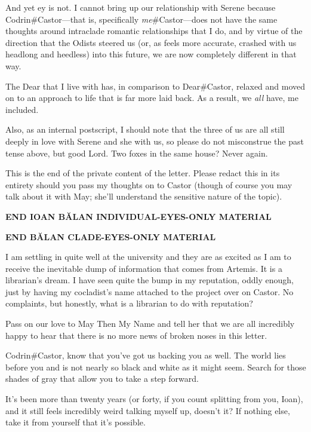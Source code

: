 And yet ey is not. I cannot bring up our relationship with Serene because Codrin\#Castor—that is, specifically \emph{me}\#Castor—does not have the same thoughts around intraclade romantic relationships that I do, and by virtue of the direction that the Odists steered us (or, as feels more accurate, crashed with us headlong and heedless) into this future, we are now completely different in that way.

The Dear that I live with has, in comparison to Dear\#Castor, relaxed and moved on to an approach to life that is far more laid back. As a result, we \emph{all} have, me included.

Also, as an internal postscript, I should note that the three of us are all still deeply in love with Serene and she with us, so please do not misconstrue the past tense above, but good Lord. Two foxes in the same house? Never again.

This is the end of the private content of the letter. Please redact this in its entirety should you pass my thoughts on to Castor (though of course you may talk about it with May; she'll understand the sensitive nature of the topic).

\begin{center}
\textbf{END IOAN BĂLAN INDIVIDUAL-EYES-ONLY MATERIAL}
\end{center}

\begin{center}
\textbf{END BĂLAN CLADE-EYES-ONLY MATERIAL}
\end{center}

\noindent I am settling in quite well at the university and they are as excited as I am to receive the inevitable dump of information that comes from Artemis. It is a librarian's dream. I have seen quite the bump in my reputation, oddly enough, just by having my cocladist's name attached to the project over on Castor. No complaints, but honestly, what is a librarian to do with reputation?

Pass on our love to May Then My Name and tell her that we are all incredibly happy to hear that there is no more news of broken noses in this letter.

Codrin\#Castor, know that you've got us backing you as well. The world lies before you and is not nearly so black and white as it might seem. Search for those shades of gray that allow you to take a step forward.

It's been more than twenty years (or forty, if you count splitting from you, Ioan), and it still feels incredibly weird talking myself up, doesn't it? If nothing else, take it from yourself that it's possible.

